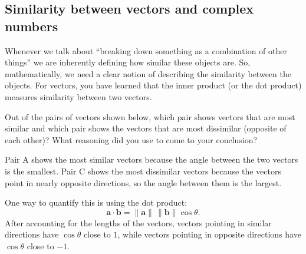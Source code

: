 \subsection{Similarity between vectors and complex numbers}
Whenever we talk about ``breaking down something as a combination of other things'' we are inherently defining how similar these objects are. So, mathematically, we need a clear notion of describing the similarity between the objects. For vectors, you have learned that the inner product (or the dot product) measures similarity between two vectors. 
\begin{popquiz}
  Out of the pairs of vectors shown below, which pair shows vectors that are most similar and which pair shows the vectors that are most dissimilar (opposite of each other)? What reasoning did you use to come to your conclusion?


  \popqsplit

  Pair A shows the most similar vectors because the angle between the two
  vectors is the smallest. Pair C shows the most dissimilar vectors because
  the vectors point in nearly opposite directions, so the angle between them
  is the largest.

  One way to quantify this is using the dot product:
  \[
    \mathbf{a}\cdot\mathbf{b}
    = \|\mathbf{a}\|\,\|\mathbf{b}\|\cos\theta.
  \]
  After accounting for the lengths of the vectors, vectors pointing in similar
  directions have $\cos\theta$ close to $1$, while vectors pointing in opposite
  directions have $\cos\theta$ close to $-1$.
\end{popquiz}

